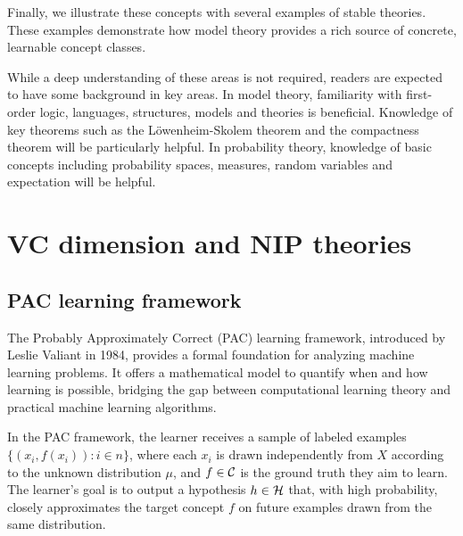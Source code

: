 \begin{outline}
\0 Finally, we illustrate these concepts with several examples of stable theories. These examples demonstrate how model theory provides a rich source of concrete, learnable concept classes.

\0 While a deep understanding of these areas is not required, readers are expected to have some background in key areas. In model theory, familiarity with first-order logic, languages, structures, models and theories is beneficial. Knowledge of key theorems such as the Löwenheim-Skolem theorem and the compactness theorem will be particularly helpful. In probability theory, knowledge of basic concepts including probability spaces, measures, random variables and expectation will be helpful. 

\end{outline}

\newpage 

\section{VC dimension and NIP theories}

\subsection{PAC learning framework}

The Probably Approximately Correct (PAC) learning framework, introduced by Leslie Valiant in 1984, provides a formal foundation for analyzing machine learning problems. It offers a mathematical model to quantify when and how learning is possible, bridging the gap between computational learning theory and practical machine learning algorithms.

In the PAC framework, the learner receives a sample of labeled examples $\{(x_i,f(x_i)) : i\in n\}$, where each $x_i$ is drawn independently from $X$ according to the unknown distribution $\mu$, and $f \in \mathcal{C}$ is the ground truth they aim to learn. The learner's goal is to output a hypothesis $h\in\mathcal{H}$ that, with high probability, closely approximates the target concept $f$ on future examples drawn from the same distribution. 

